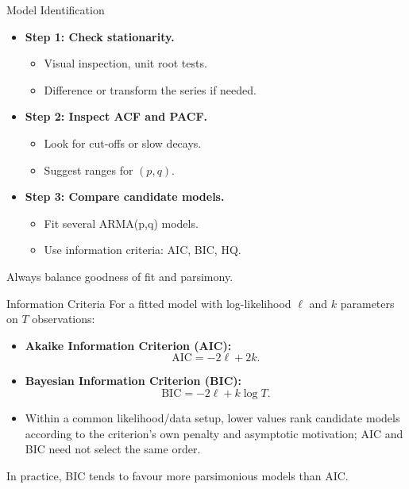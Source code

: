\documentclass{beamer}
\begin{document}
\begin{frame}{Model Identification}
  \begin{itemize}
    \item \textbf{Step 1: Check stationarity.}
      \begin{itemize}
        \item Visual inspection, unit root tests.
        \item Difference or transform the series if needed.
      \end{itemize}
    \item \textbf{Step 2: Inspect ACF and PACF.}
      \begin{itemize}
        \item Look for cut-offs or slow decays.
        \item Suggest ranges for $(p, q)$.
      \end{itemize}
    \item \textbf{Step 3: Compare candidate models.}
      \begin{itemize}
        \item Fit several ARMA(p,q) models.
        \item Use information criteria: AIC, BIC, HQ.
      \end{itemize}
  \end{itemize}

  \vspace{0.2cm}
  Always balance goodness of fit and parsimony.
\end{frame}

\begin{frame}{Information Criteria}
  For a fitted model with log-likelihood $\ell$ and $k$ parameters on $T$ observations:
  \begin{itemize}
    \item \textbf{Akaike Information Criterion (AIC):}
      \[
        \text{AIC} = -2\ell + 2k.
      \]
    \item \textbf{Bayesian Information Criterion (BIC):}
      \[
        \text{BIC} = -2\ell + k \log T.
      \]
    \item Within a common likelihood/data setup, lower values rank candidate models according to the criterion's own penalty and asymptotic motivation; AIC and BIC need not select the same order.
  \end{itemize}

  \vspace{0.2cm}
  In practice, BIC tends to favour more parsimonious models than AIC.
\end{frame}
\end{document}
